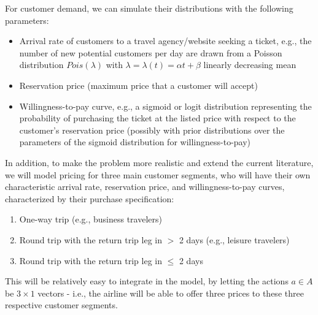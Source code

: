 \documentclass[]{article}
\begin{document}
For customer demand, we can simulate their distributions with the following parameters:
\begin{itemize}
  \item Arrival rate of customers to a travel agency/website seeking a ticket, e.g., the number of new potential customers per day are drawn from a Poisson distribution $Pois(\lambda)$ with $\lambda=\lambda(t)=\alpha t+\beta$ linearly decreasing mean
  \item Reservation price (maximum price that a customer will accept)
  \item Willingness-to-pay curve, e.g., a sigmoid or logit distribution representing the probability of purchasing the ticket at the listed price with respect to the customer's reservation price (possibly with prior distributions over the parameters of the sigmoid distribution for willingness-to-pay)
\end{itemize}

In addition, to make the problem more realistic and extend the current literature, we will model pricing for three main customer segments, who will have their own characteristic arrival rate, reservation price, and willingness-to-pay curves, characterized by their purchase specification:
\begin{enumerate}
  \item One-way trip (e.g., business travelers)
  \item Round trip with the return trip leg in $>$ 2 days (e.g., leisure travelers)
  \item Round trip with the return trip leg in $\leq$ 2 days
\end{enumerate}

This will be relatively easy to integrate in the model, by letting the actions $a \in A$ be $3\times1$ vectors - i.e., the airline will be able to offer three prices to these three respective customer segments.
\end{document}
